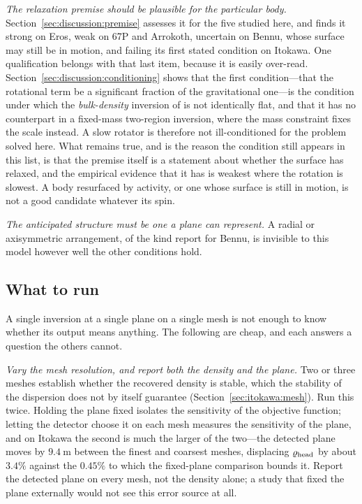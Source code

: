 \emph{The relaxation premise should be plausible for the particular body.}
Section~\ref{sec:discussion:premise} assesses it for the five studied here,
and finds it strong on Eros, weak on 67P and Arrokoth, uncertain on Bennu,
whose surface may still be in motion, and failing its first stated condition
on Itokawa. One qualification belongs with that last item, because it is
easily over-read. Section~\ref{sec:discussion:conditioning} shows that the
first condition---that the rotational term be a significant fraction of the
gravitational one---is the condition under which the \emph{bulk-density}
inversion of \citet{richardson2014} is not identically flat, and that it has
no counterpart in a fixed-mass two-region inversion, where the mass
constraint fixes the scale instead. A slow rotator is therefore not
ill-conditioned for the problem solved here. What remains true, and is the
reason the condition still appears in this list, is that the premise itself
is a statement about whether the surface has relaxed, and the empirical
evidence that it has is weakest where the rotation is slowest. A body
resurfaced by activity, or one whose surface is still in motion, is not a
good candidate whatever its spin.

\emph{The anticipated structure must be one a plane can represent.} A radial
or axisymmetric arrangement, of the kind \citet{scheeres2020} report for
Bennu, is invisible to this model however well the other conditions hold.

\subsection{What to run}
\label{sec:guidelines:what}

A single inversion at a single plane on a single mesh is not enough to know
whether its output means anything. The following are cheap, and each answers
a question the others cannot.

\emph{Vary the mesh resolution, and report both the density and the plane.}
Two or three meshes establish whether the recovered density is stable, which
the stability of the dispersion does not by itself guarantee
(Section~\ref{sec:itokawa:mesh}). Run this twice. Holding the plane fixed
isolates the sensitivity of the objective function; letting the detector
choose it on each mesh measures the sensitivity of the plane, and on Itokawa
the second is much the larger of the two---the detected plane moves by
$\SI{9.4}{\metre}$ between the finest and coarsest meshes, displacing
$\varrho_{\mathrm{head}}$ by about $3.4\%$ against the $0.45\%$ to which the fixed-plane
comparison bounds it. Report the detected plane on every mesh, not the
density alone; a study that fixed the plane externally would not see this
error source at all.

